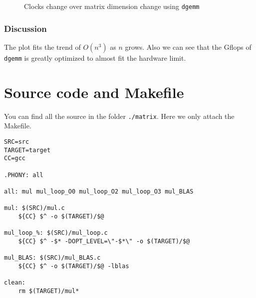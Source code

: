 \documentclass[12pt]{article}
\begin{document}
\begin{figure}[t]
  \centering
  \caption{Clocks change over matrix dimension change using \lstinline{dgemm}}
\end{figure}

\subsubsection{Discussion}
The plot fits the trend of $O(n^3)$ as $n$ grows.
Also we can see that the Gflops of \lstinline{dgemm} is greatly optimized to almost fit the hardware limit.

\appendix

\section{Source code and Makefile}

You can find all the source in the folder \lstinline{./matrix}.
Here we only attach the Makefile.

\label{sec:makefile}
\begin{lstlisting}
SRC=src
TARGET=target
CC=gcc

.PHONY: all

all: mul mul_loop_O0 mul_loop_O2 mul_loop_O3 mul_BLAS

mul: $(SRC)/mul.c
	${CC} $^ -o $(TARGET)/$@

mul_loop_%: $(SRC)/mul_loop.c
	${CC} $^ -$* -DOPT_LEVEL=\"-$*\" -o $(TARGET)/$@

mul_BLAS: $(SRC)/mul_BLAS.c
	${CC} $^ -o $(TARGET)/$@ -lblas

clean: 
	rm $(TARGET)/mul*
\end{lstlisting}
\end{document}
